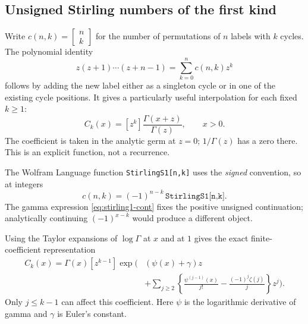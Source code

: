 \documentclass[11pt,a4paper]{article}
\numberwithin{equation}{section}
\theoremstyle{definition}
\theoremstyle{remark}
\newcommand{\StirI}[2]{\left[\begin{matrix}#1\\#2\end{matrix}\right]}
\begin{document}
\subsection{Unsigned Stirling numbers of the first kind}

Write $c(n,k)=\StirI nk$ for the number of permutations of $n$ labels with $k$ cycles. The polynomial identity
\[
 z(z+1)\cdots(z+n-1)=\sum_{k=0}^n c(n,k)z^k
\]
follows by adding the new label either as a singleton cycle or in one of the existing cycle positions. It gives a particularly useful interpolation for each fixed $k\ge1$:
\begin{equation}
 C_k(x)=[z^k]\frac{\Gamma(x+z)}{\Gamma(z)},\qquad x>0.
 \label{eq:stirling1-cont}
\end{equation}
The coefficient is taken in the analytic germ at $z=0$; $1/\Gamma(z)$ has a zero there. This is an explicit function, not a recurrence.

The Wolfram Language function \texttt{StirlingS1[n,k]} uses the \emph{signed} convention, so at integers
\[
 c(n,k)=(-1)^{n-k}\,\texttt{StirlingS1[n,k]}.
\]
The gamma expression \eqref{eq:stirling1-cont} fixes the positive unsigned continuation; analytically continuing $(-1)^{x-k}$ would produce a different object.

Using the Taylor expansions of $\log\Gamma$ at $x$ and at $1$ gives the exact finite-coefficient representation
\begin{align}
 C_k(x)=\Gamma(x)[z^{k-1}]\exp\Bigg(& (\psi(x)+\gamma)z\nonumber\\
 &+\sum_{j\ge2}\left\{\frac{\psi^{(j-1)}(x)}{j!}
                  -\frac{(-1)^j\zeta(j)}j\right\}z^j\Bigg).
 \label{eq:stirling1-polygamma}
\end{align}
Only $j\le k-1$ can affect this coefficient. Here $\psi$ is the logarithmic derivative of gamma and $\gamma$ is Euler's constant.
\end{document}
